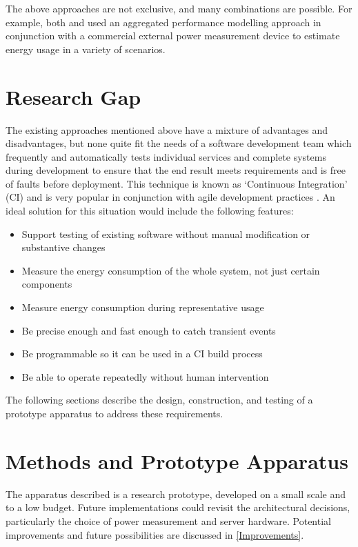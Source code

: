The above approaches are not exclusive, and many combinations are possible. For example, both \citet{Kaup2014} and \citet{Stoico2023} used an aggregated performance modelling approach in conjunction with a commercial external power measurement device to estimate energy usage in a variety of scenarios.

\section{Research Gap}

The existing approaches mentioned above have a mixture of advantages and disadvantages, but none quite fit the needs of a software development team which frequently and automatically tests individual services and complete systems during development to ensure that the end result meets requirements and is free of faults before deployment. This technique is known as `Continuous Integration' (CI) \citep{Meyer2014} and is very popular in conjunction with agile development practices \citep{Shahin2017}. An ideal solution for this situation would include the following features:

\begin{itemize}
\item Support testing of existing software without manual modification or substantive changes
\item Measure the energy consumption of the whole system, not just certain components
\item Measure energy consumption during representative usage
\item Be precise enough and fast enough to catch transient events
\item Be programmable so it can be used in a CI build process
\item Be able to operate repeatedly without human intervention
\end{itemize}

The following sections describe the design, construction, and testing of a prototype apparatus to address these requirements.

\section{Methods and Prototype Apparatus}

The apparatus described is a research prototype, developed on a small scale and to a low budget. Future implementations could revisit the architectural decisions, particularly the choice of power measurement and server hardware. Potential improvements and future possibilities are discussed in \autoref{Improvements}.

